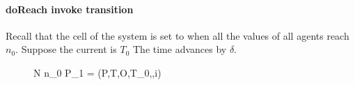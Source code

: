 \paragraph{doReach invoke transition} Recall that the  cell of the system is set to  when all the  values of all agents reach $n_0$. Suppose the current  is $T_0$ The time advances by $\delta$. 
%


\begin{figure}
\label{fig:lock1}
{N  n_0  P_{1} = (P,T,O,T_0,\delta,i)}{}{}{}
\end{figure}


